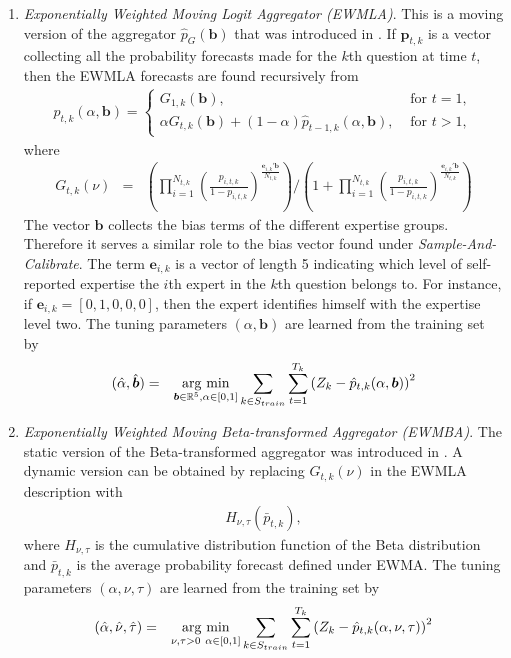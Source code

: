 \documentclass[aoas, preprint]{imsart}
\newcommand{\argmin}{\operatornamewithlimits{arg\ min}}
\numberwithin{equation}{section}
\theoremstyle{plain}
\newcommand{\R}{\mathbb{R}}
\begin{document}
\begin{enumerate}
\begin{enumerate}
 
\item  \textit{Exponentially Weighted Moving Logit Aggregator (EWMLA)}. This is a moving version of the aggregator $\hat{p}_G(\boldsymbol{b})$ that was introduced in \cite{satopaa}. If $\boldsymbol{p}_{t,k}$ is a vector collecting all the probability forecasts made for the $k$th question at time $t$, then the EWMLA forecasts are found recursively from
\begin{eqnarray*}
\hat{p}_{t,k}(\alpha, \boldsymbol{b}) =
\begin{cases}
G_{1,k}(\boldsymbol{b} ), & \text{ for } t  = 1, \\
\alpha G_{t,k}(\boldsymbol{b} )  + (1-\alpha) \hat{p}_{t-1,k}(\alpha, \boldsymbol{b}),  & \text{ for } t > 1,
\end{cases}
\end{eqnarray*}
where
\small
\begin{eqnarray*}
G_{t,k}(\nu )  &=& \left( \prod\limits_{i=1}^{N_{t,k}} \left( \frac{p_{i, t, k}}{1-p_{i, t, k}} \right)^{ \frac{\boldsymbol{e}_{i,k}'\boldsymbol{b}}{N_{t,k}}} \right) \Bigg/ \left(1+ \prod\limits_{i=1}^{N_{t,k}} \left( \frac{p_{i, t, k}}{1-p_{i, t, k}} \right)^{\frac{\boldsymbol{e}_{i,k}' \boldsymbol{b}}{N_{t,k}}} \right)
\end{eqnarray*}
\normalsize
The vector $\boldsymbol{b}$ collects the bias terms of the different expertise groups. Therefore it serves a similar role to the bias vector found under \textit{Sample-And-Calibrate}. The term $\boldsymbol{e}_{i,k}$ is a vector of length 5 indicating which level of self-reported expertise the $i$th expert in the $k$th question belongs to. For instance, if $\boldsymbol{e}_{i,k} = [0, 1, 0, 0, 0]$, then the expert identifies himself with the expertise level two. The tuning parameters $(\alpha, \boldsymbol{b})$ are learned from the training set by
\begin{eqnarray*}
(\hat{\alpha}, \hat{ \boldsymbol{b}}) &=& \argmin_{ \boldsymbol{b} \in \R^5, \alpha \in [0,1]} \sum_{k \in S_{train}} \sum_{t=1}^{T_k} \left(Z_k - \hat{p}_{t,k}(\alpha,  \boldsymbol{b})\right)^2
\end{eqnarray*}


\item  \textit{Exponentially Weighted Moving Beta-transformed Aggregator (EWMBA)}. The static version of the Beta-transformed  aggregator was introduced in \cite{Ranjan08}. A dynamic version can be obtained by replacing $G_{t,k}(\nu )$ in the EWMLA description with
\begin{eqnarray*}
H_{\nu, \tau} \left( \bar{p}_{t,k}\right),
\end{eqnarray*}
where $H_{\nu, \tau}$ is the cumulative distribution function of the Beta distribution and $\bar{p}_{t,k}$ is the average probability forecast defined under EWMA. The tuning parameters $(\alpha, \nu, \tau)$ are learned from the training set by
\begin{eqnarray*}
(\hat{\alpha}, \hat{\nu}, \hat{\tau}) &=& \argmin_{\nu, \tau > 0\ \alpha \in [0,1]} \sum_{k \in S_{train}} \sum_{t=1}^{T_k} \left(Z_k - \hat{p}_{t,k}(\alpha, \nu, \tau)\right)^2
\end{eqnarray*} 


\end{enumerate}
\end{enumerate}
\end{document}
